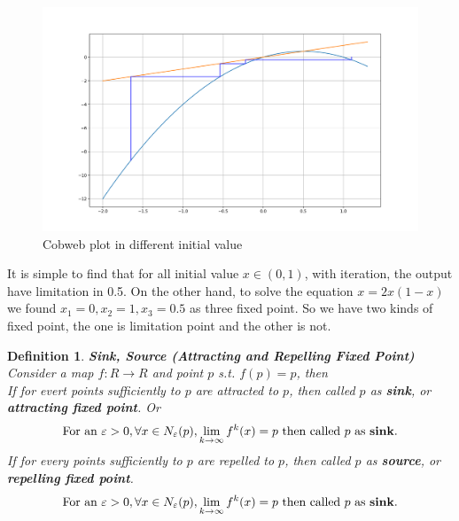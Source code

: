 \documentclass[12pt]{article}
\theoremstyle{plain}
\newtheorem{definition}{\textbf{Definition}}[section]
\begin{document}
\begin{figure}[H]
\begin{minipage}[c][0.6\width]{
   0.5\textwidth}
\end{minipage}
\begin{minipage}[c][0.6\width]{
   0.5\textwidth}
   \centering
   \includegraphics[width=1\textwidth]{figure/section1/cb04.png}
\end{minipage}
\caption{Cobweb plot in different initial value}\label{logistic-cobweb-plot}
\end{figure}


It is simple to find that for all initial value $x \in (0, 1)$, with iteration, the output have limitation in 0.5. On the other hand, to solve the equation $x = 2x(1-x)$ we found $x_1 = 0, x_2 = 1, x_3 = 0.5$ as three fixed point. So we have two kinds of fixed point, the one is limitation point and the other is not.


\begin{definition}\textbf{Sink, Source (Attracting and Repelling Fixed Point)}
\\\noindent Consider a map $f: R \rightarrow R$ and point $p$ s.t. $f(p) = p$, then
\\\noindent If for evert points sufficiently to $p$ are attracted to $p$, then called $p$ as \textbf{sink}, or \textbf{attracting fixed point}. Or
$$
\text{For an } \varepsilon > 0, \forall x \in N_\varepsilon(p), \lim_{k \rightarrow \infty}f^k(x) = p \text{ then called } p \text{ as \textbf{sink}}.
$$
If for every points sufficiently to $p$ are repelled to $p$, then called $p$ as \textbf{source}, or \textbf{repelling fixed point}.
$$
\text{For an } \varepsilon > 0, \forall x \in N_\varepsilon(p), \lim_{k \rightarrow \infty}f^k(x) = p \text{ then called } p \text{ as \textbf{sink}}.
$$
\end{definition}



\newpage
\end{document}
